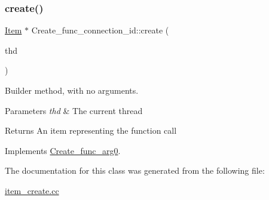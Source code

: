 \subsubsection{\texorpdfstring{create()}{create()}}
{\footnotesize\ttfamily \mbox{\hyperlink{classItem}{Item}} $\ast$ Create\+\_\+func\+\_\+connection\+\_\+id\+::create (\begin{DoxyParamCaption}\item[{T\+HD $\ast$}]{thd }\end{DoxyParamCaption})\hspace{0.3cm}{\ttfamily [virtual]}}

Builder method, with no arguments. 
\begin{DoxyParams}{Parameters}
{\em thd} & The current thread \\
\hline
\end{DoxyParams}
\begin{DoxyReturn}{Returns}
An item representing the function call 
\end{DoxyReturn}


Implements \mbox{\hyperlink{classCreate__func__arg0_abb65b43817f9382759c79487228ee29f}{Create\+\_\+func\+\_\+arg0}}.



The documentation for this class was generated from the following file\+:\begin{DoxyCompactItemize}
\item 
\mbox{\hyperlink{item__create_8cc}{item\+\_\+create.\+cc}}\end{DoxyCompactItemize}
